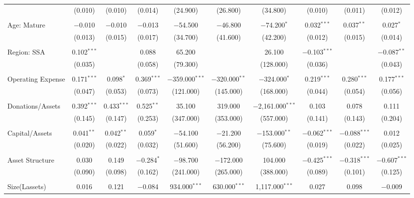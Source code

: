 \documentclass[a4paper, nobind]{templates/ociamthesis}
\begin{document}
\begin{landscape}
\begin{table}[!htbp]
\begin{tabular}{@{\extracolsep{5pt}}lccccccccc}
  & (0.010) & (0.010) & (0.014) & (24.900) & (26.800) & (34.800) & (0.010) & (0.011) & (0.012) \\ 
  & & & & & & & & & \\ 
 Age: Mature & $-$0.010 & $-$0.010 & $-$0.013 & $-$54.500 & $-$46.800 & $-$74.200$^{*}$ & 0.032$^{***}$ & 0.037$^{**}$ & 0.027$^{*}$ \\ 
  & (0.013) & (0.015) & (0.017) & (34.700) & (41.600) & (42.200) & (0.012) & (0.015) & (0.014) \\ 
  & & & & & & & & & \\ 
 Region: SSA & 0.102$^{***}$ &  & 0.088 & 65.200 &  & 26.100 & $-$0.103$^{***}$ &  & $-$0.087$^{**}$ \\ 
  & (0.035) &  & (0.058) & (79.300) &  & (128.000) & (0.036) &  & (0.043) \\ 
  & & & & & & & & & \\ 
 Operating Expense & 0.171$^{***}$ & 0.098$^{*}$ & 0.369$^{***}$ & $-$359.000$^{***}$ & $-$320.000$^{**}$ & $-$324.000$^{*}$ & 0.219$^{***}$ & 0.280$^{***}$ & 0.177$^{***}$ \\ 
  & (0.047) & (0.053) & (0.073) & (121.000) & (145.000) & (168.000) & (0.044) & (0.054) & (0.056) \\ 
  & & & & & & & & & \\ 
 Donations/Assets & 0.392$^{***}$ & 0.433$^{***}$ & 0.525$^{**}$ & 35.100 & 319.000 & $-$2,161.000$^{***}$ & 0.103 & 0.078 & 0.111 \\ 
  & (0.145) & (0.147) & (0.253) & (347.000) & (353.000) & (557.000) & (0.141) & (0.143) & (0.204) \\ 
  & & & & & & & & & \\ 
 Capital/Assets & 0.041$^{**}$ & 0.042$^{**}$ & 0.059$^{*}$ & $-$54.100 & $-$21.200 & $-$153.000$^{**}$ & $-$0.062$^{***}$ & $-$0.088$^{***}$ & 0.012 \\ 
  & (0.020) & (0.022) & (0.032) & (51.600) & (56.200) & (75.600) & (0.019) & (0.022) & (0.025) \\ 
  & & & & & & & & & \\ 
 Asset Structure & 0.030 & 0.149 & $-$0.284$^{*}$ & $-$98.700 & $-$172.000 & 104.000 & $-$0.425$^{***}$ & $-$0.318$^{***}$ & $-$0.607$^{***}$ \\ 
  & (0.090) & (0.098) & (0.162) & (241.000) & (265.000) & (388.000) & (0.089) & (0.101) & (0.125) \\ 
  & & & & & & & & & \\ 
 Size(Lassets) & 0.016 & 0.121 & $-$0.084 & 934.000$^{***}$ & 630.000$^{***}$ & 1,117.000$^{***}$ & 0.027 & 0.098 & $-$0.009 \\ 

\end{tabular}
\end{table}
\end{landscape}
\end{document}
